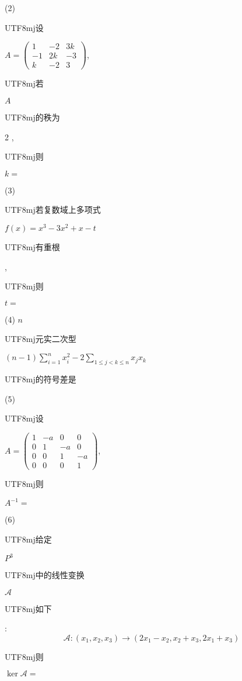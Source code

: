\documentclass[10pt]{article}
\begin{document}
(2) \begin{CJK}{UTF8}{mj}设\end{CJK} $A=\left(\begin{array}{ccc}1 & -2 & 3 k \\ -1 & 2 k & -3 \\ k & -2 & 3\end{array}\right)$, \begin{CJK}{UTF8}{mj}若\end{CJK} $A$ \begin{CJK}{UTF8}{mj}的秩为\end{CJK} 2 , \begin{CJK}{UTF8}{mj}则\end{CJK} $k=$

(3) \begin{CJK}{UTF8}{mj}若复数域上多项式\end{CJK} $f(x)=x^{3}-3 x^{2}+x-t$ \begin{CJK}{UTF8}{mj}有重根\end{CJK}, \begin{CJK}{UTF8}{mj}则\end{CJK} $t=$

(4) $n$ \begin{CJK}{UTF8}{mj}元实二次型\end{CJK} $(n-1) \sum_{i=1}^{n} x_{i}^{2}-2 \sum_{1 \leqslant j<k \leqslant n} x_{j} x_{k}$ \begin{CJK}{UTF8}{mj}的符号差是\end{CJK}

(5) \begin{CJK}{UTF8}{mj}设\end{CJK} $A=\left(\begin{array}{cccc}1 & -a & 0 & 0 \\ 0 & 1 & -a & 0 \\ 0 & 0 & 1 & -a \\ 0 & 0 & 0 & 1\end{array}\right)$, \begin{CJK}{UTF8}{mj}则\end{CJK} $A^{-1}=$

(6) \begin{CJK}{UTF8}{mj}给定\end{CJK} $P^{3}$ \begin{CJK}{UTF8}{mj}中的线性变换\end{CJK} $\mathscr{A}$ \begin{CJK}{UTF8}{mj}如下\end{CJK}:
$$
\mathscr{A}:\left(x_{1}, x_{2}, x_{3}\right) \rightarrow\left(2 x_{1}-x_{2}, x_{2}+x_{3}, 2 x_{1}+x_{3}\right)
$$
\begin{CJK}{UTF8}{mj}则\end{CJK} $\operatorname{ker} \mathscr{A}=$
\end{document}
